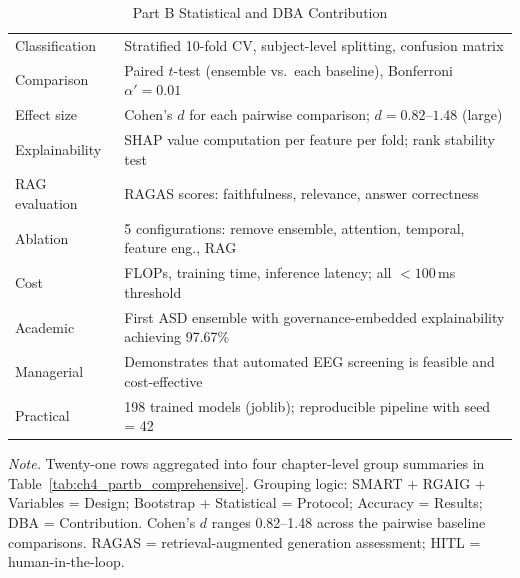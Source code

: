 {\tablestripes\tablefontsize
{}
\begin{xltabular}{\textwidth}{@{} >{\raggedright\arraybackslash}p{2.5cm} L @{}}
\caption[Part B Statistical and DBA Contribution]{Part B Statistical and DBA Contribution}\label{tab:appd_partb_stats_contribution} \\
\toprule
{} &  \\
\midrule
\endfirsthead
\endhead
\bottomrule
\endlastfoot
Classification & Stratified 10-fold CV, subject-level splitting, confusion matrix \\
Comparison & Paired $t$-test (ensemble vs.\ each baseline), Bonferroni $\alpha' = 0.01$ \\
Effect size & Cohen's $d$ for each pairwise comparison; $d = 0.82$--$1.48$ (large) \\
Explainability & SHAP value computation per feature per fold; rank stability test \\
RAG evaluation & RAGAS scores: faithfulness, relevance, answer correctness \\
Ablation & 5 configurations: remove ensemble, attention, temporal, feature eng., RAG \\
Cost & FLOPs, training time, inference latency; all $< 100$\,ms threshold \\
Academic & First ASD ensemble with governance-embedded explainability achieving 97.67\% \\
Managerial & Demonstrates that automated EEG screening is feasible and cost-effective \\
Practical & 198 trained models (joblib); reproducible pipeline with seed = 42 \\
\end{xltabular}}
\vspace{0.4em}
\noindent\textit{Note.} Twenty-one rows aggregated into four chapter-level group summaries in Table~\ref{tab:ch4_partb_comprehensive}. Grouping logic: SMART + RGAIG + Variables = Design; Bootstrap + Statistical = Protocol; Accuracy = Results; DBA = Contribution. Cohen's $d$ ranges 0.82--1.48 across the pairwise baseline comparisons. RAGAS = retrieval-augmented generation assessment; HITL = human-in-the-loop.

